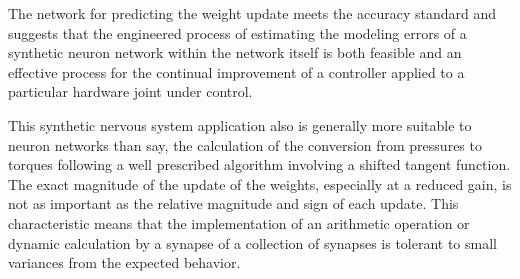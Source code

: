 
The network for predicting the weight update meets the accuracy standard and suggests that
the engineered process of estimating the modeling errors of a synthetic neuron
network within the network itself is both feasible and an effective process for
the continual improvement of a controller applied to a particular hardware
joint under control.

This synthetic nervous system application also is generally more suitable to neuron networks than say,
the calculation of the conversion from pressures to torques following a well
prescribed algorithm involving a shifted tangent function. The exact magnitude
of the update of the weights, especially at a reduced gain, is not as important
as the relative magnitude and sign of each update. This characteristic means that the
implementation of an arithmetic operation or dynamic calculation by a synapse of
a collection of synapses is tolerant to small variances from the expected
behavior.
